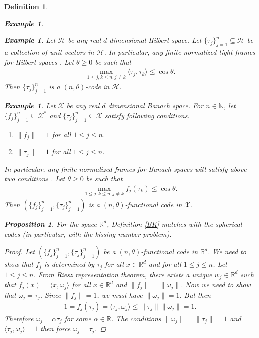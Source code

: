 \documentclass{amsart}
\newtheorem{definition}[theorem]{Definition}
\newtheorem{example}[theorem]{Example}
\newtheorem{proposition}[theorem]{Proposition}
\begin{document}
\begin{definition}
\begin{example}
\end{example}
\begin{example}
	Let $\mathcal{H}$ be any  real $d$ dimensional Hilbert space. Let   $ \{\tau_j \}_{j=1}^n \subseteq \mathcal{H}$ be a collection of unit vectors  in  $\mathcal{H}$.  In particular, any finite normalized tight frames for Hilbert spaces \cite{BENEDETTOFICKUS}. Let $\theta\geq 0$ be such that 
	\begin{align*}
		\max_{1\leq j, k\leq n, j \neq k}\langle \tau_j, \tau_k \rangle \leq \cos \theta.
	\end{align*}
Then $\{\tau_j \}_{j=1}^n$  is a $(n,\theta)$-code in $ \mathcal{H}$.
\end{example}
\begin{example}
	Let $\mathcal{X}$ be any  real $d$ dimensional Banach space.  For $n \in \mathbb{N}$, let   $ \{f_j \}_{j=1}^n\subseteq \mathcal{X}^*$ and $ \{\tau_j \}_{j=1}^n \subseteq \mathcal{X}$ satisfy following conditions.
\begin{enumerate}[\upshape(i)]
	\item $\|f_j\|=1$ for all $1\leq j \leq n$.
	\item $\|\tau_j\|= 1$ for all $1\leq j \leq n$.
\end{enumerate}
In particular, any finite normalized frames for Banach spaces will satisfy above two conditions \cite{KORNELSON}. Let $\theta\geq 0$ be such that 
\begin{align*}
	\max_{1\leq j, k\leq n, j \neq k}f_j(\tau_k) \leq \cos \theta.
\end{align*}
Then  $ (\{f_j \}_{j=1}^n, \{\tau_j \}_{j=1}^n) $ is a $(n,\theta)$-functional code in $ \mathcal{X}$. 	
\end{example}
\begin{proposition}\label{R}
	For the space $\mathbb{R}^d$, Definition \ref{BK} matches with the spherical codes (in particular, with the kissing-number problem).
\end{proposition}
\begin{proof}
Let $ (\{f_j \}_{j=1}^n, \{\tau_j \}_{j=1}^n) $ be a $(n,\theta)$-functional code in $\mathbb{R}^d$. We need to show that $f_j$ is determined by $\tau_j$ for all $x\in \mathbb{R}^d$ and  for all $1\leq j \leq n$. Let $1\leq j \leq n$. From Riesz representation theorem, there exists a unique $w_j \in \mathbb{R}^d$ such that $f_j(x)=\langle x, \omega_j\rangle$  for all $x\in \mathbb{R}^d$ and $\|f_j\|=\|\omega_j\|$. Now we need to show that $\omega_j=\tau_j$. Since $\|f_j\|=1$, we must have $\|\omega_j\|=1$. But then
\begin{align*}
	1=f_j(\tau_j)=\langle \tau_j, \omega_j\rangle \leq \|\tau_j\|\|\omega_j\|=1.
\end{align*}
Therefore $\omega_j=\alpha \tau_j$  for some $\alpha \in \mathbb{R}$. The conditions $\|\omega_j\|=\|\tau_j\|=1$ and $\langle \tau_j, \omega_j\rangle =1$ then force $\omega_j=\tau_j$. 
\end{proof}
\end{definition}
\end{document}
